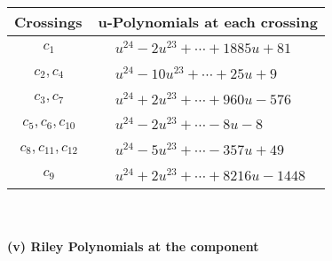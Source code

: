 \documentclass[1p]{elsarticle_modified}
\theoremstyle{definition}
\begin{document}
\begin{tabular}{m{50pt}|m{274pt}}
Crossings & \hspace{64pt}u-Polynomials at each crossing \\
\hline $$\begin{aligned}c_{1}\end{aligned}$$&$\begin{aligned}
&u^{24}-2 u^{23}+\cdots+1885 u+81
\end{aligned}$\\
\hline $$\begin{aligned}c_{2},c_{4}\end{aligned}$$&$\begin{aligned}
&u^{24}-10 u^{23}+\cdots+25 u+9
\end{aligned}$\\
\hline $$\begin{aligned}c_{3},c_{7}\end{aligned}$$&$\begin{aligned}
&u^{24}+2 u^{23}+\cdots+960 u-576
\end{aligned}$\\
\hline $$\begin{aligned}c_{5},c_{6},c_{10}\end{aligned}$$&$\begin{aligned}
&u^{24}-2 u^{23}+\cdots-8 u-8
\end{aligned}$\\
\hline $$\begin{aligned}c_{8},c_{11},c_{12}\end{aligned}$$&$\begin{aligned}
&u^{24}-5 u^{23}+\cdots-357 u+49
\end{aligned}$\\
\hline $$\begin{aligned}c_{9}\end{aligned}$$&$\begin{aligned}
&u^{24}+2 u^{23}+\cdots+8216 u-1448
\end{aligned}$\\
\hline
\end{tabular}\\~\\
\newpage\renewcommand{\arraystretch}{1}
\flushleft \textbf{(v) Riley Polynomials at the component}\newline \\
\end{document}
